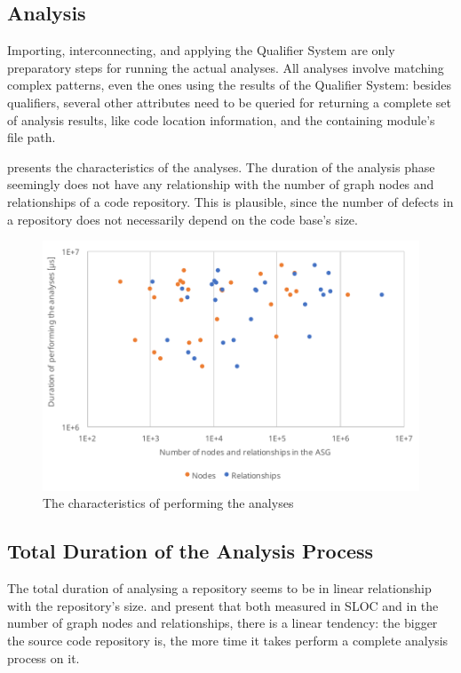 \subsection{Analysis}

Importing, interconnecting, and applying the Qualifier System are only preparatory steps for running the actual analyses. All analyses involve matching complex patterns, even the ones using the results of the Qualifier System: besides qualifiers, several other attributes need to be queried for returning a complete set of analysis results, like code location information, and the containing module's file path.

 presents the characteristics of the analyses. The duration of the analysis phase seemingly does not have any relationship with the number of graph nodes and relationships of a code repository. This is plausible, since the number of defects in a repository does not necessarily depend on the code base's size.

\begin{figure}[!htb]
	\centerfloat
	\includegraphics[width=\textwidth,clip]{figures/measurement-analysis-nodes-relationships.pdf}
	\caption{The characteristics of performing the analyses}
	\label{fig:measurement-analysis-nodes-relationships}
\end{figure}

\subsection{Total Duration of the Analysis Process}

The total duration of analysing a repository seems to be in linear relationship with the repository's size.  and  present that both measured in SLOC and in the number of graph nodes and relationships, there is a linear tendency: the bigger the source code repository is, the more time it takes perform a complete analysis process on it.

